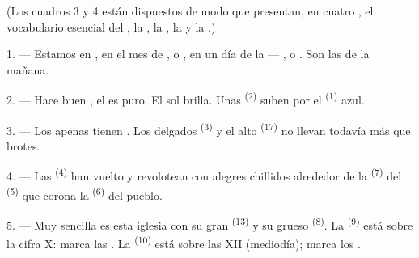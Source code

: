 
\VUsaut{3.0mm}
\VUsaut{1.6mm}
\VUsaut{3.4mm}

(Los cuadros 3 y 4 están dispuestos de modo que presentan, en cuatro
, el vocabulario esencial del ,
la , la , la  y la .)
\VUsaut{4.0mm}

\VUsaut{3.0mm}

\VUsaut{2.4mm}

\VUsaut{3.0mm}

1. --- Estamos en , en el mes de ,
 o , en un día de la  ---
,  o . Son las
 de la mañana.

2. --- Hace buen , el  es puro. El sol brilla.
Unas  \textsuperscript{(2)} suben por el 
\textsuperscript{(1)} azul.

3. --- Los  apenas tienen . Los delgados
 \textsuperscript{(3)} y el alto  \textsuperscript{(17)} no
llevan todavía más que brotes.

4. --- Las  \textsuperscript{(4)} han vuelto y revolotean con
alegres chillidos alrededor de la  \textsuperscript{(7)} del
 \textsuperscript{(5)} que corona la 
\textsuperscript{(6)} del pueblo.

\VUsaut{3.4mm}
\VUsaut{3.0mm}

5. --- Muy sencilla es esta iglesia con su gran 
\textsuperscript{(13)} y su grueso  \textsuperscript{(8)}. La
 \textsuperscript{(9)} está sobre la cifra X: marca las
. La  \textsuperscript{(10)} está sobre las XII
(mediodía); marca los .

